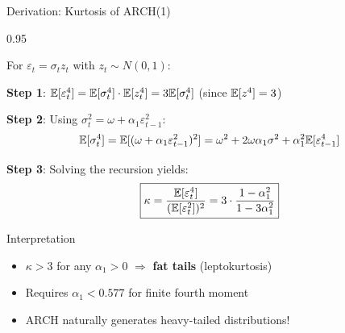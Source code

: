 \documentclass[9pt, aspectratio=169, t]{beamer}
\begin{document}
\begin{frame}{Derivation: Kurtosis of ARCH(1)}
    \begin{cminipage}{0.95\textwidth}
    {\small
    For $\varepsilon_t = \sigma_t z_t$ with $z_t \sim N(0,1)$:

    \textbf{Step 1}: $\mathbb{E}[\varepsilon_t^4] = \mathbb{E}[\sigma_t^4] \cdot \mathbb{E}[z_t^4] = 3 \mathbb{E}[\sigma_t^4]$ \quad (since $\mathbb{E}[z^4] = 3$)

    \textbf{Step 2}: Using $\sigma_t^2 = \omega + \alpha_1 \varepsilon_{t-1}^2$:
    \[
        \mathbb{E}[\sigma_t^4] = \mathbb{E}[(\omega + \alpha_1 \varepsilon_{t-1}^2)^2] = \omega^2 + 2\omega\alpha_1 \sigma^2 + \alpha_1^2 \mathbb{E}[\varepsilon_{t-1}^4]
    \]

    \textbf{Step 3}: Solving the recursion yields:
    \[
        \boxed{\kappa = \frac{\mathbb{E}[\varepsilon_t^4]}{(\mathbb{E}[\varepsilon_t^2])^2} = 3 \cdot \frac{1 - \alpha_1^2}{1 - 3\alpha_1^2}}
    \]
    }

    \begin{block}{Interpretation}
        \begin{itemize}\setlength{\itemsep}{0pt}
            \item $\kappa > 3$ for any $\alpha_1 > 0$ $\Rightarrow$ \textbf{fat tails} (leptokurtosis)
            \item Requires $\alpha_1 < 0.577$ for finite fourth moment
            \item ARCH naturally generates heavy-tailed distributions!
        \end{itemize}
    \end{block}
    \end{cminipage}
\end{frame}
\end{document}
